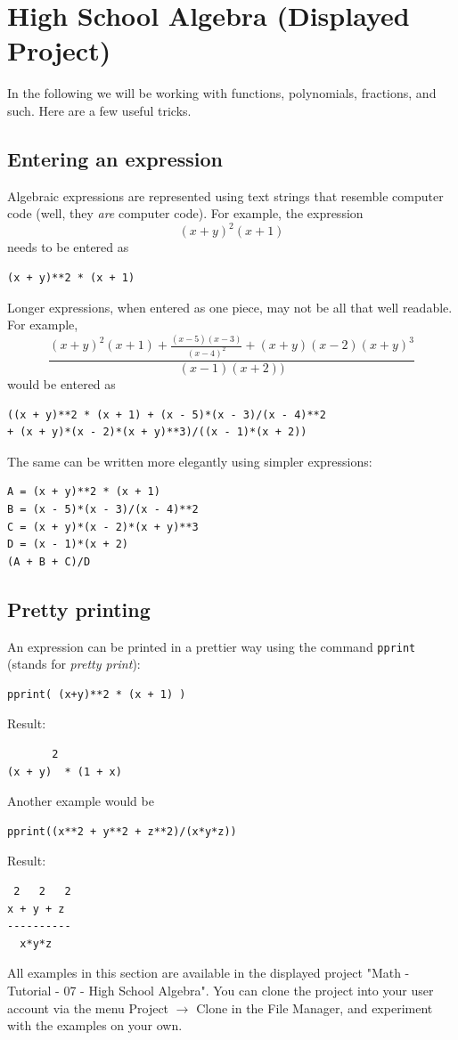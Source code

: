 \documentclass[article,A4,12pt]{llncs}
\begin{document}

\section{High School Algebra (Displayed Project)}\label{algebra}

In the following we will be working with functions, polynomials, fractions, and such.
Here are a few useful tricks.

\subsection{Entering an expression}
Algebraic expressions are represented using text strings that resemble 
computer code (well, they {\em are} computer code). For example, the expression 
$$
  (x + y)^2 (x + 1)
$$ 
needs to be entered as
\begin{verbatim}
(x + y)**2 * (x + 1)
\end{verbatim}
Longer expressions, when entered as one piece, may not be all that well readable. For example,
$$
\frac{(x + y)^2 (x + 1) + \frac{(x-5)(x-3)}{(x-4)^2} + (x + y)(x - 2)(x + y)^3}{(x-1)(x+2))}
$$ 
would be entered as 
\begin{verbatim}
((x + y)**2 * (x + 1) + (x - 5)*(x - 3)/(x - 4)**2 
+ (x + y)*(x - 2)*(x + y)**3)/((x - 1)*(x + 2))
\end{verbatim}
The same can be written more elegantly using simpler expressions:
\begin{verbatim}
A = (x + y)**2 * (x + 1)
B = (x - 5)*(x - 3)/(x - 4)**2
C = (x + y)*(x - 2)*(x + y)**3
D = (x - 1)*(x + 2)
(A + B + C)/D
\end{verbatim}

\subsection{Pretty printing}
An expression can be printed in a prettier way using the command {\tt pprint} (stands for {\em pretty print}):
\begin{verbatim}
pprint( (x+y)**2 * (x + 1) )
\end{verbatim}
Result:
\begin{verbatim}
       2
(x + y)  * (1 + x)
\end{verbatim}
Another example would be
\begin{verbatim}
pprint((x**2 + y**2 + z**2)/(x*y*z))
\end{verbatim}
Result:
\begin{verbatim}
 2   2   2
x + y + z
----------
  x*y*z   
\end{verbatim}
All examples in this section are available in the displayed project 
"Math - Tutorial - 07 - High School Algebra". You can clone the project into 
your user account via the menu Project $\rightarrow$ Clone in the File 
Manager, and experiment with the examples on your own.
\end{document}
